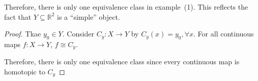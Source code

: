 Therefore, there is only one equivalence class in example~(1).
This reflects the fact that $Y\subseteq\mathbb{R}^2$ is a ``simple'' object.

\begin{proof}
Tkae $y_0\in Y$.
Consider $C_y:X\to Y$ by $C_y(x)=y_0,\forall x$.
For all continuous maps $f:X\to Y$, $f\cong C_y$.

Therefore, there is only one equivalence class since every continuous map is homotopic to $C_y$
\end{proof}





















